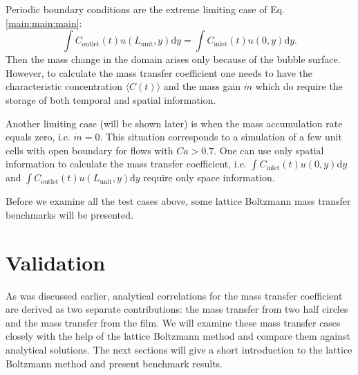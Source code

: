 \documentclass{article}
\newcommand{\beqstar}{\begin{equation*}}
\newcommand{\feqstar}{\end{equation*}}
\newcommand{\lunit}{L_{\mathrm{unit}}}
\newcommand{\cinlet}{C_{\mathrm{inlet}}}
\newcommand{\coutlet}{C_{\mathrm{outlet}}}
\begin{document}
Periodic boundary conditions are the extreme
limiting case of Eq. \ref{main:main:main}: 
\beqstar
\int{\coutlet(t)
u(\lunit,y)\mathrm{d}y}=\int{\cinlet(t) u(0,y)\mathrm{d}y}. 
\feqstar
Then the mass change in the domain arises only because of the bubble
surface. However, to calculate the mass transfer coefficient one needs to have
the characteristic concentration  $\langle C(t) \rangle$ and the mass gain $\dot{m}$
which do require the storage of both temporal and spatial information.

Another limiting case (will be shown later) is when the mass accumulation rate equals zero, i.e. $\dot{m}=0$. 
This situation corresponds to a simulation of a few unit cells with open boundary for flows with
$Ca>0.7$.   One
can use only spatial information to calculate the mass transfer coefficient,
i.e. $\int{\cinlet(t) u(0,y) \mathrm{d}y}$ and $\int{\coutlet(t)
u(\lunit,y)\mathrm{d}y}$ require only space information. 

Before we examine all the test cases above, some lattice Boltzmann mass transfer
benchmarks will be presented. 

\section{Validation}
As was discussed earlier, analytical correlations for the mass transfer coefficient
are derived  as two separate contributions: the mass transfer from two
half circles and the mass transfer from the film. We will examine these
mass transfer cases closely with the help of the lattice Boltzmann method and compare them
against analytical
solutions. The next sections will give a short introduction to the lattice Boltzmann method and present benchmark results.
\end{document}
